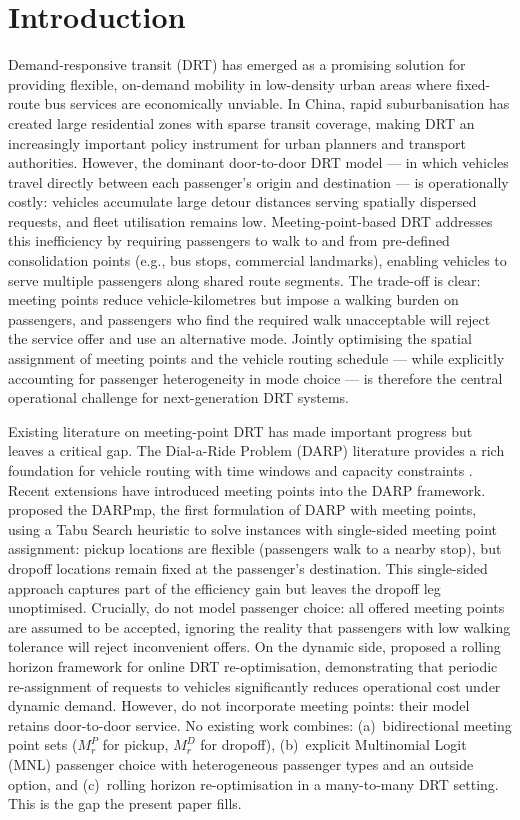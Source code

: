\section{Introduction}
\label{sec:intro}

Demand-responsive transit (DRT) has emerged as a promising solution for providing
flexible, on-demand mobility in low-density urban areas where fixed-route bus services
are economically unviable.
In China, rapid suburbanisation has created large residential zones with sparse transit
coverage, making DRT an increasingly important policy instrument for urban planners
and transport authorities.
However, the dominant door-to-door DRT model — in which vehicles travel directly
between each passenger's origin and destination — is operationally costly: vehicles
accumulate large detour distances serving spatially dispersed requests, and fleet
utilisation remains low.
Meeting-point-based DRT addresses this inefficiency by requiring passengers to walk
to and from pre-defined consolidation points (e.g., bus stops, commercial landmarks),
enabling vehicles to serve multiple passengers along shared route segments.
The trade-off is clear: meeting points reduce vehicle-kilometres but impose a walking
burden on passengers, and passengers who find the required walk unacceptable will
reject the service offer and use an alternative mode.
Jointly optimising the spatial assignment of meeting points and the vehicle routing
schedule — while explicitly accounting for passenger heterogeneity in mode choice —
is therefore the central operational challenge for next-generation DRT systems.

Existing literature on meeting-point DRT has made important progress but leaves a
critical gap.
The Dial-a-Ride Problem (DARP) literature provides a rich foundation for vehicle
routing with time windows and capacity constraints
\citep{cordeau2007,ho2018}.
Recent extensions have introduced meeting points into the DARP framework.
\citet{cortenbach2024} proposed the DARPmp, the first formulation of DARP with
meeting points, using a Tabu Search heuristic to solve instances with single-sided
meeting point assignment: pickup locations are flexible (passengers walk to a nearby
stop), but dropoff locations remain fixed at the passenger's destination.
This single-sided approach captures part of the efficiency gain but leaves the dropoff
leg unoptimised.
Crucially, \citet{cortenbach2024} do not model passenger choice: all offered meeting
points are assumed to be accepted, ignoring the reality that passengers with low
walking tolerance will reject inconvenient offers.
On the dynamic side, \citet{wu2025} proposed a rolling horizon framework for
online DRT re-optimisation, demonstrating that periodic re-assignment of requests
to vehicles significantly reduces operational cost under dynamic demand.
However, \citet{wu2025} do not incorporate meeting points: their model retains
door-to-door service.
No existing work combines: (a)~bidirectional meeting point sets ($M_r^P$ for pickup,
$M_r^D$ for dropoff), (b)~explicit Multinomial Logit (MNL) passenger choice with
heterogeneous passenger types and an outside option, and (c)~rolling horizon
re-optimisation in a many-to-many DRT setting.
This is the gap the present paper fills.

